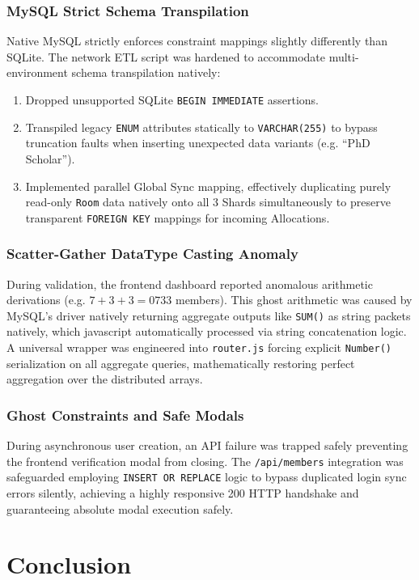 \documentclass[sigconf]{acmart}
\begin{document}
\subsubsection{MySQL Strict Schema Transpilation}
Native MySQL strictly enforces constraint mappings slightly differently than SQLite. The network ETL script was hardened to accommodate multi-environment schema transpilation natively:
\begin{enumerate}[leftmargin=*]
    \item Dropped unsupported SQLite \texttt{BEGIN IMMEDIATE} assertions.
    \item Transpiled legacy \texttt{ENUM} attributes statically to \texttt{VARCHAR(255)} to bypass truncation faults when inserting unexpected data variants (e.g. ``PhD Scholar'').
    \item Implemented parallel Global Sync mapping, effectively duplicating purely read-only \texttt{Room} data natively onto all 3 Shards simultaneously to preserve transparent \texttt{FOREIGN KEY} mappings for incoming Allocations.
\end{enumerate}

\subsubsection{Scatter-Gather DataType Casting Anomaly}
During validation, the frontend dashboard reported anomalous arithmetic derivations (e.g. $7 + 3 + 3 = 0733$ members). This ghost arithmetic was caused by MySQL's driver natively returning aggregate outputs like \texttt{SUM()} as string packets natively, which javascript automatically processed via string concatenation logic. A universal wrapper was engineered into \texttt{router.js} forcing explicit \texttt{Number()} serialization on all aggregate queries, mathematically restoring perfect aggregation over the distributed arrays.

\subsubsection{Ghost Constraints and Safe Modals}
During asynchronous user creation, an API failure was trapped safely preventing the frontend verification modal from closing. The \texttt{/api/members} integration was safeguarded employing \texttt{INSERT OR REPLACE} logic to bypass duplicated login sync errors silently, achieving a highly responsive 200 HTTP handshake and guaranteeing absolute modal execution safely.

\section{Conclusion}
\end{document}
